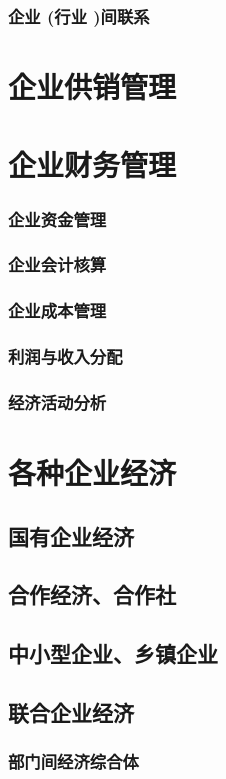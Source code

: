 \documentclass[UTF8]{../../RepresentationUniverse}
\begin{document}
    \subsubsection{企业 (行业 )间联系}
\section{企业供销管理}
\section{企业财务管理}
    \subsubsection{企业资金管理}
    \subsubsection{企业会计核算}
    \subsubsection{企业成本管理}
    \subsubsection{利润与收入分配}
    \subsubsection{经济活动分析}
\section{各种企业经济}
    \subsection{国有企业经济}
    \subsection{合作经济、合作社}
    \subsection{中小型企业、乡镇企业}
    \subsection{联合企业经济}
        \subsubsection{部门间经济综合体}
\end{document}
